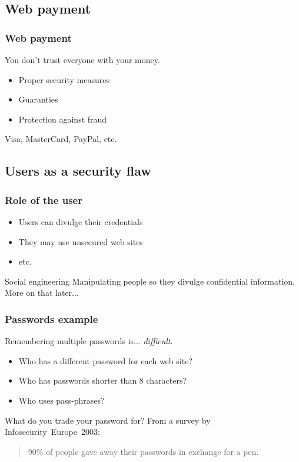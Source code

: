 \subsection{Web payment}

\begin{frame}
\frametitle{Web payment}
\begin{center}
You don't trust everyone with your money.
\end{center}
\begin{itemize}
\item Proper security measures
\item Guaranties
\item Protection against fraud
\end{itemize}
\begin{example}
Visa, MasterCard, PayPal, etc.
\end{example}
\end{frame}

\subsection{Users as a security flaw}

\begin{frame}
\frametitle{Role of the user}
\begin{itemize}
\item Users can divulge their credentials
\item They may use unsecured web sites
\item etc.
\end{itemize}
\begin{block}{Social engineering}
Manipulating people so they divulge confidential information.
\\ More on that later...
\end{block}
\end{frame}

\begin{frame}
\frametitle{Passwords example}
Remembering multiple passwords is... \emph{difficult}.
\begin{itemize}
\item Who has a different password for each web site?
\item Who has passwords shorter than 8 characters?
\item Who uses pass-phrases?
\end{itemize}
\pause
\begin{exampleblock}{What do you trade your password for?}
From a survey by Infosecurity~Europe~2003:
\begin{quote}
90\% of people gave away their passwords in exchange for a pen.
\end{quote}
\end{exampleblock}
\end{frame}

